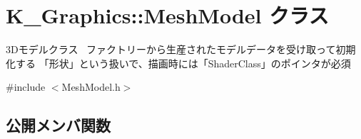 \hypertarget{class_k___graphics_1_1_mesh_model}{}\section{K\+\_\+\+Graphics\+:\+:Mesh\+Model クラス}
\label{class_k___graphics_1_1_mesh_model}


3\+Dモデルクラス~\newline
ファクトリーから生産されたモデルデータを受け取って初期化する 「形状」という扱いで、描画時には「\+Shader\+Class」のポインタが必須  




{\ttfamily \#include $<$Mesh\+Model.\+h$>$}

\subsection*{公開メンバ関数}
